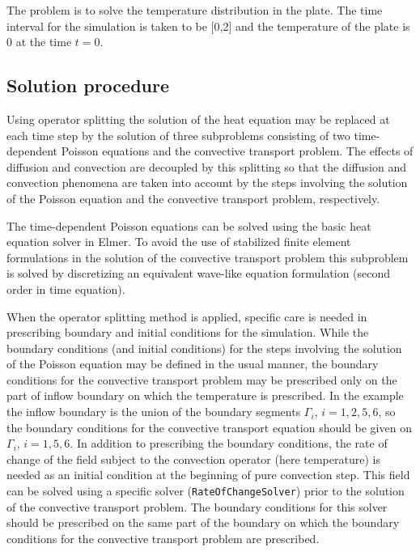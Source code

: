 The problem is to solve the temperature distribution in the plate. 
The time interval for the simulation is taken to be [0,2] and the temperature 
of the plate is 0 at the time $t=0$. 


\subsection*{Solution procedure}

Using operator splitting the solution of the heat equation may be replaced 
at each time step by the solution of three subproblems consisting of two 
time-dependent Poisson equations and the convective transport problem.
The effects of diffusion and convection are decoupled by this 
splitting so that 
the diffusion and convection phenomena are taken into account by the steps 
involving the solution of the Poisson equation and the convective transport 
problem, respectively. 

The time-dependent Poisson equations can be solved using the basic heat 
equation solver in Elmer. To avoid the use of stabilized finite element 
formulations in the solution of the convective transport problem this 
subproblem is solved by discretizing an equivalent wave-like equation 
formulation (second order in time equation). 
  
When the operator splitting method is applied,
specific care is needed in prescribing boundary and initial conditions
for the simulation. While the boundary conditions (and initial conditions) 
for the steps involving the solution of the Poisson equation may be defined in 
the usual manner, the boundary conditions for the convective 
transport problem may be prescribed
only on the part of inflow boundary on which the temperature is prescribed. 
In the example the inflow boundary is the union of the boundary segments 
$\Gamma_i$, $i=1,2,5,6$,
so the boundary conditions for the convective transport equation 
should be given on $\Gamma_i$, $i=1,5,6$.
In addition to prescribing the boundary conditions, the rate of change of
the field subject to the convection operator (here temperature) is needed as 
an initial condition at the beginning of pure convection step. This field 
can be solved using a specific solver ({\tt RateOfChangeSolver}) prior to
the solution of the convective transport problem. 
The boundary conditions for this 
solver should be prescribed on the same part of the boundary on which the 
boundary conditions for the convective transport problem are prescribed.    

